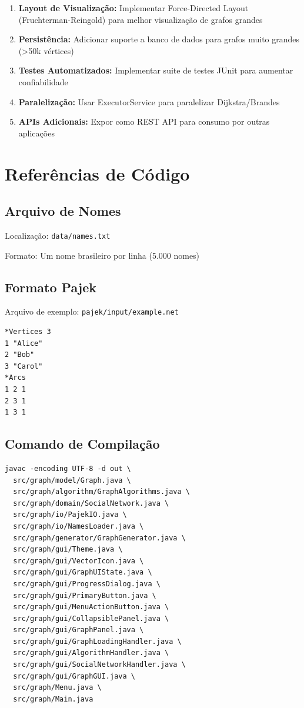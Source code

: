 \documentclass[12pt,a4paper]{article}
\begin{document}
    \begin{enumerate}
        \item \textbf{Layout de Visualização:} Implementar Force-Directed Layout (Fruchterman-Reingold) para melhor visualização de grafos grandes
        \item \textbf{Persistência:} Adicionar suporte a banco de dados para grafos muito grandes (>50k vértices)
        \item \textbf{Testes Automatizados:} Implementar suite de testes JUnit para aumentar confiabilidade
        \item \textbf{Paralelização:} Usar ExecutorService para paralelizar Dijkstra/Brandes
        \item \textbf{APIs Adicionais:} Expor como REST API para consumo por outras aplicações
    \end{enumerate}

    \appendix

    \section{Referências de Código}

    \subsection{Arquivo de Nomes}

    Localização: \texttt{data/names.txt}

    Formato: Um nome brasileiro por linha (5.000 nomes)

    \subsection{Formato Pajek}

    Arquivo de exemplo: \texttt{pajek/input/example.net}

    \begin{verbatim}
*Vertices 3
1 "Alice"
2 "Bob"
3 "Carol"
*Arcs
1 2 1
2 3 1
1 3 1
    \end{verbatim}

    \subsection{Comando de Compilação}

    \begin{verbatim}
javac -encoding UTF-8 -d out \
  src/graph/model/Graph.java \
  src/graph/algorithm/GraphAlgorithms.java \
  src/graph/domain/SocialNetwork.java \
  src/graph/io/PajekIO.java \
  src/graph/io/NamesLoader.java \
  src/graph/generator/GraphGenerator.java \
  src/graph/gui/Theme.java \
  src/graph/gui/VectorIcon.java \
  src/graph/gui/GraphUIState.java \
  src/graph/gui/ProgressDialog.java \
  src/graph/gui/PrimaryButton.java \
  src/graph/gui/MenuActionButton.java \
  src/graph/gui/CollapsiblePanel.java \
  src/graph/gui/GraphPanel.java \
  src/graph/gui/GraphLoadingHandler.java \
  src/graph/gui/AlgorithmHandler.java \
  src/graph/gui/SocialNetworkHandler.java \
  src/graph/gui/GraphGUI.java \
  src/graph/Menu.java \
  src/graph/Main.java
    \end{verbatim}
\end{document}
